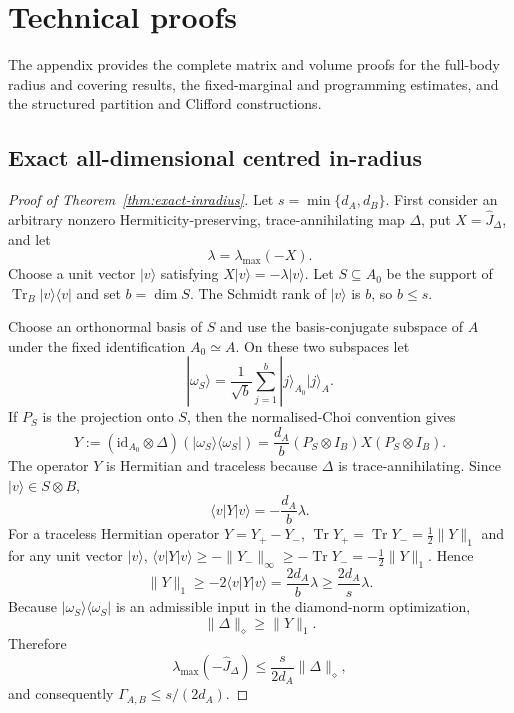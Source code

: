 \documentclass[11pt,a4paper]{article}
\theoremstyle{definition}
\theoremstyle{plain}
\theoremstyle{remark}
\DeclareMathOperator{\Tr}{Tr}
\newcommand{\id}{\mathrm{id}}
\begin{document}
\appendix
\section{Technical proofs}
\label{app:technical-proofs}

The appendix provides the complete matrix and volume proofs for the
full-body radius and covering results, the fixed-marginal and programming
estimates, and the structured partition and Clifford constructions.

\subsection{Exact all-dimensional centred in-radius}
\label{app:exact-inradius-proof}

\begin{proof}[Proof of Theorem~\ref{thm:exact-inradius}]
Let $s=\min\{d_A,d_B\}$. First consider an arbitrary nonzero
Hermiticity-preserving, trace-annihilating map $\Delta$, put
$X=\widehat J_\Delta$, and let
\[
\lambda=\lambda_{\max}(-X).
\]
Choose a unit vector $|v\rangle$ satisfying $X|v\rangle=-\lambda|v\rangle$.
Let $S\subseteq A_0$ be the support of
$\Tr_B|v\rangle\langle v|$ and set $b=\dim S$. The Schmidt rank of
$|v\rangle$ is $b$, so $b\leq s$.

Choose an orthonormal basis of $S$ and use the basis-conjugate subspace of
$A$ under the fixed identification $A_0\simeq A$. On these two subspaces
let
\[
|\omega_S\rangle
=\frac1{\sqrt b}\sum_{j=1}^b|j\rangle_{A_0}|j\rangle_A.
\]
If $P_S$ is the projection onto $S$, then the normalised-Choi convention
gives
\[
Y:=(\id_{A_0}\otimes\Delta)
(|\omega_S\rangle\langle\omega_S|)
=\frac{d_A}{b}(P_S\otimes I_B)X(P_S\otimes I_B).
\]
The operator $Y$ is Hermitian and traceless because $\Delta$ is
trace-annihilating. Since $|v\rangle\in S\otimes B$,
\[
\langle v|Y|v\rangle=-\frac{d_A}{b}\lambda.
\]
For a traceless Hermitian operator $Y=Y_+-Y_-$, $\Tr Y_+=\Tr Y_-=\frac12\|Y\|_1$ and for any unit vector $|v\rangle$, $\langle v|Y|v\rangle\ge -\|Y_-\|_\infty\ge -\Tr Y_- = -\frac12\|Y\|_1$. Hence
\[
\|Y\|_1
\geq-2\langle v|Y|v\rangle
=\frac{2d_A}{b}\lambda
\geq\frac{2d_A}{s}\lambda.
\]
Because $|\omega_S\rangle\langle\omega_S|$ is an admissible input in the
diamond-norm optimization,
\[
\|\Delta\|_\diamond\geq\|Y\|_1.
\]
Therefore
\[
\lambda_{\max}(-\widehat J_\Delta)
\leq\frac{s}{2d_A}\|\Delta\|_\diamond,
\]
and consequently $\Gamma_{A,B}\leq s/(2d_A)$.


\end{proof}
\end{document}
